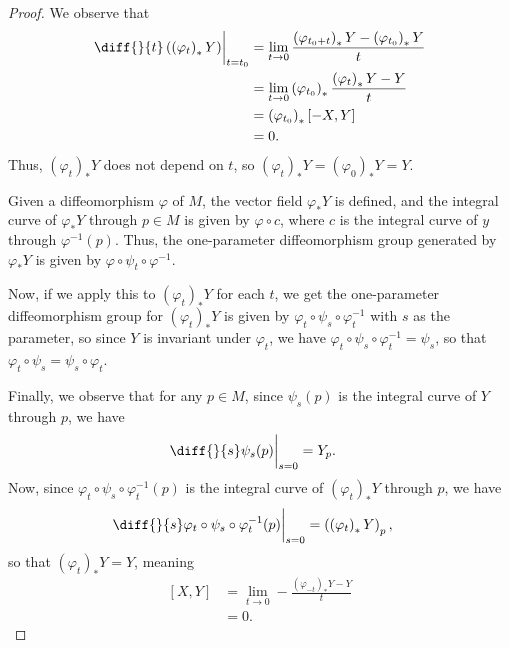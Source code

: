 \documentclass[10pt]{mypackage}
\begin{document}
\begin{proof}
  We observe that
  \begin{align*}
    \diff{}{t}\left( \left( \varphi_t \right)_{\ast}Y \right)\biggr\vert_{t=t_0} &= \lim_{t\rightarrow 0} \frac{\left( \varphi_{t_0 + t} \right)_{\ast}Y - \left( \varphi_{t_0} \right)_{\ast}Y}{t}\\
                                                                                 &= \lim_{t\rightarrow 0} \left( \varphi_{t_0} \right)_{\ast} \frac{\left( \varphi_t \right)_{\ast}Y - Y}{t}\\
                                                                                 &= \left( \varphi_{t_0} \right)_{\ast} \left[ -X,Y \right]\\
                                                                                 &= 0.
  \end{align*}
  Thus, $\left( \varphi_t \right)_{\ast}Y$ does not depend on $t$, so $\left( \varphi_t \right)_{\ast}Y = \left( \varphi_0 \right)_{\ast}Y = Y$.\newline

  Given a diffeomorphism $\varphi$ of $M$, the vector field $\varphi_{\ast}Y$ is defined, and the integral curve of $\varphi_{\ast}Y$ through $p\in M$ is given by $\varphi\circ c$, where $c$ is the integral curve of $y$ through $\varphi^{-1}(p)$. Thus, the one-parameter diffeomorphism group generated by $\varphi_{\ast}Y$ is given by $\varphi\circ\psi_t\circ\varphi^{-1}$.\newline

  Now, if we apply this to $\left( \varphi_t \right)_{\ast}Y$ for each $t$, we get the one-parameter diffeomorphism group for $\left( \varphi_t \right)_{\ast}Y$ is given by $\varphi_t\circ\psi_s\circ\varphi_t^{-1}$ with $s$ as the parameter, so since $Y$ is invariant under $\varphi_t$, we have $\varphi_t\circ\psi_s\circ\varphi_t^{-1} = \psi_s$, so that $\varphi_t\circ\psi_s = \psi_s\circ\varphi_t$.\newline

  Finally, we observe that for any $p\in M$, since $\psi_s(p)$ is the integral curve of $Y$ through $p$, we have
  \begin{align*}
    \diff{}{s} \psi_s(p)\biggr\vert_{s=0} &= Y_{p}.
  \end{align*}
  Now, since $\varphi_t\circ\psi_s\circ\varphi_t^{-1}(p)$ is the integral curve of $\left( \varphi_t \right)_{\ast}Y$ through $p$, we have
  \begin{align*}
    \diff{}{s} \varphi_t\circ\psi_s\circ\varphi_t^{-1}(p)\biggr\vert_{s = 0} &= \left( \left( \varphi_t \right)_{\ast}Y \right)_{p},
  \end{align*}
  so that $\left( \varphi_{t} \right)_{\ast}Y = Y$, meaning
  \begin{align*}
    \left[ X,Y \right] &= \lim_{t\rightarrow 0} -\frac{\left( \varphi_{-t} \right)_{\ast}Y - Y}{t}\\
                       &= 0.
  \end{align*}
\end{proof}
\end{document}
